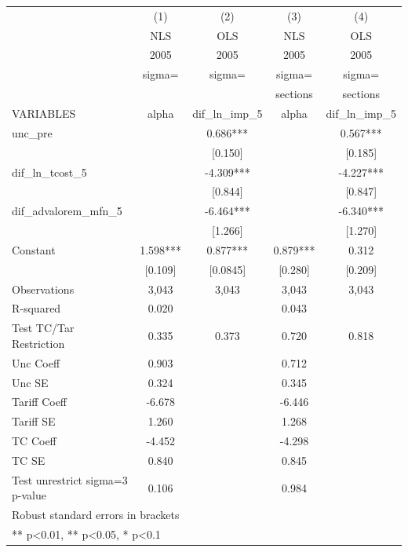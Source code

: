 \begin{tabular}{lcccc}
\toprule
 & (1) & (2) & (3) & (4) \\
 & NLS & OLS & NLS & OLS \\
 & 2005 & 2005 & 2005 & 2005 \\
 & sigma= & sigma= & sigma= & sigma= \\
 &  &  & sections & sections \\
VARIABLES & alpha & dif\_ln\_imp\_5 & alpha & dif\_ln\_imp\_5 \\
\midrule
unc\_pre &  & 0.686*** &  & 0.567*** \\
 &  & [0.150] &  & [0.185] \\
dif\_ln\_tcost\_5 &  & -4.309*** &  & -4.227*** \\
 &  & [0.844] &  & [0.847] \\
dif\_advalorem\_mfn\_5 &  & -6.464*** &  & -6.340*** \\
 &  & [1.266] &  & [1.270] \\
Constant & 1.598*** & 0.877*** & 0.879*** & 0.312 \\
 & [0.109] & [0.0845] & [0.280] & [0.209] \\
\midrule
Observations & 3,043 & 3,043 & 3,043 & 3,043 \\
R-squared & 0.020 &  & 0.043 &  \\
Test TC/Tar Restriction & 0.335 & 0.373 & 0.720 & 0.818 \\
Unc Coeff & 0.903 &  & 0.712 &  \\
Unc SE & 0.324 &  & 0.345 &  \\
Tariff Coeff & -6.678 &  & -6.446 &  \\
Tariff SE & 1.260 &  & 1.268 &  \\
TC Coeff & -4.452 &  & -4.298 &  \\
TC SE & 0.840 &  & 0.845 &  \\
Test unrestrict sigma=3 p-value & 0.106 &  & 0.984 &  \\
\bottomrule
\multicolumn{5}{l}{\footnotesize Robust standard errors in brackets} \\
\multicolumn{5}{l}{\footnotesize *** p<0.01, ** p<0.05, * p<0.1} \\
\end{tabular}
